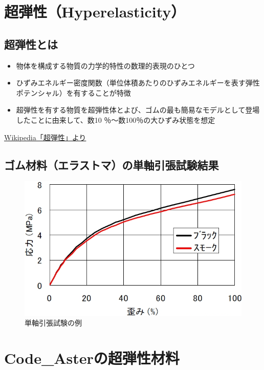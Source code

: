 \section{超弾性（Hyperelasticity）}
\subsection{超弾性とは}
\begin{itemize}
	\item 物体を構成する物質の力学的特性の数理的表現のひとつ
	\item ひずみエネルギー密度関数（単位体積あたりのひずみエネルギーを表す弾性ポテンシャル）を有することが特徴
	\item 超弾性を有する物質を超弾性体とよび、ゴムの最も簡易なモデルとして登場したことに由来して、数10 ％～数100％の大ひずみ状態を想定
\end{itemize}
\vspace{-\baselineskip}
\begin{flushright}
	\href{https://ja.wikipedia.org/wiki/%E8%B6%85%E5%BC%BE%E6%80%A7}{Wikipedia「超弾性」より}
\end{flushright}
\vspace{-\baselineskip}
\subsection{ゴム材料（エラストマ）の単軸引張試験結果}
\vspace{-\baselineskip}
\begin{figure}[H]
	\caption{単軸引張試験の例}
	\label{fig:002}
	\centering
	\includegraphics[width=0.4\columnwidth]{fig/tensile test.png}
\end{figure}
\section{Code\_Asterの超弾性材料}
